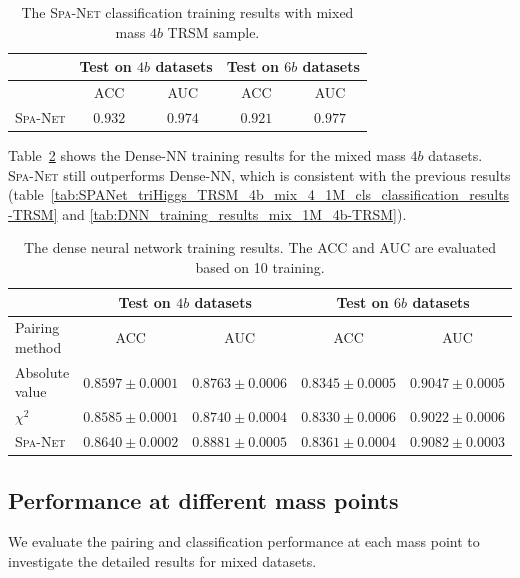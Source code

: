 \documentclass[12pt]{article}
\begin{document}
    \begin{table}[htpb]
        \centering
        \caption{The \textsc{Spa-Net} classification training results with mixed mass $4b$ TRSM sample.}
        \label{tab:SPANet_triHiggs_TRSM_4b-mix_4-750k-cls_classification_results}
        \begin{tabular}{c|cc|cc}
                         & \multicolumn{2}{c|}{Test on $4b$ datasets}& \multicolumn{2}{c}{Test on $6b$ datasets} \\ \hline
                         & ACC                 & AUC                 & ACC                 & AUC                 \\ \hline
        \textsc{Spa-Net} & $0.932$             & $0.974$             & $0.921$             & $0.977$
        \end{tabular}
    \end{table}

    Table~\ref{tab:DNN_training_results_mix_750k_4b-TRSM} shows the Dense-NN training results for the mixed mass $4b$ datasets. \textsc{Spa-Net} still outperforms Dense-NN, which is consistent with the previous results (table~\ref{tab:SPANet_triHiggs_TRSM_4b_mix_4_1M_cls_classification_results-TRSM} and \ref{tab:DNN_training_results_mix_1M_4b-TRSM}).
    \begin{table}[htpb]
        \centering
        \caption{The dense neural network training results. The ACC and AUC are evaluated based on 10 training.}
        \label{tab:DNN_training_results_mix_750k_4b-TRSM}
        \begin{tabular}{l|cc|cc}
                         & \multicolumn{2}{c|}{Test on $4b$ datasets}& \multicolumn{2}{c}{Test on $6b$ datasets} \\ \hline
        Pairing method   & ACC                 & AUC                 & ACC                 & AUC                 \\ \hline
        Absolute value   & $0.8597 \pm 0.0001$ & $0.8763 \pm 0.0006$ & $0.8345 \pm 0.0005$ & $0.9047 \pm 0.0005$ \\
        $\chi^2$         & $0.8585 \pm 0.0001$ & $0.8740 \pm 0.0004$ & $0.8330 \pm 0.0006$ & $0.9022 \pm 0.0006$ \\
        \textsc{Spa-Net} & $0.8640 \pm 0.0002$ & $0.8881 \pm 0.0005$ & $0.8361 \pm 0.0004$ & $0.9082 \pm 0.0003$
        \end{tabular}
    \end{table}
    \subsection{Performance at different mass points}%
    \label{sub:performance_at_different_mass_points}
        We evaluate the pairing and classification performance at each mass point to investigate the detailed results for mixed datasets.
\end{document}
